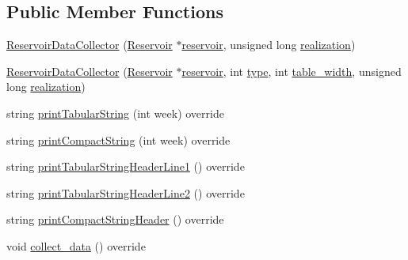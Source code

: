 \subsection*{Public Member Functions}
\begin{DoxyCompactItemize}
\item 
\mbox{\hyperlink{classReservoirDataCollector_a7647adce7b2d7a8598ae678a5015dde5_a7647adce7b2d7a8598ae678a5015dde5}{Reservoir\+Data\+Collector}} (\mbox{\hyperlink{classReservoir}{Reservoir}} $\ast$\mbox{\hyperlink{classReservoirDataCollector_a188c8509a43e7f28362407f7508fde27_a188c8509a43e7f28362407f7508fde27}{reservoir}}, unsigned long \mbox{\hyperlink{classDataCollector_a9ef2887466fe3123aa19ef956a219b96_a9ef2887466fe3123aa19ef956a219b96}{realization}})
\item 
\mbox{\hyperlink{classReservoirDataCollector_aaca132902fa717e71a0b0d5d5078c04c_aaca132902fa717e71a0b0d5d5078c04c}{Reservoir\+Data\+Collector}} (\mbox{\hyperlink{classReservoir}{Reservoir}} $\ast$\mbox{\hyperlink{classReservoirDataCollector_a188c8509a43e7f28362407f7508fde27_a188c8509a43e7f28362407f7508fde27}{reservoir}}, int \mbox{\hyperlink{classDataCollector_acad1c22d67a8eb3db056ba776a131900_acad1c22d67a8eb3db056ba776a131900}{type}}, int \mbox{\hyperlink{classDataCollector_af46c27a47de92d92dcdae6b26a905a44_af46c27a47de92d92dcdae6b26a905a44}{table\+\_\+width}}, unsigned long \mbox{\hyperlink{classDataCollector_a9ef2887466fe3123aa19ef956a219b96_a9ef2887466fe3123aa19ef956a219b96}{realization}})
\item 
string \mbox{\hyperlink{classReservoirDataCollector_a81777b029bf26be403b9f4d67f01588b_a81777b029bf26be403b9f4d67f01588b}{print\+Tabular\+String}} (int week) override
\item 
string \mbox{\hyperlink{classReservoirDataCollector_a0b68d7fa4a6d704350340d1ac3e8a1d2_a0b68d7fa4a6d704350340d1ac3e8a1d2}{print\+Compact\+String}} (int week) override
\item 
string \mbox{\hyperlink{classReservoirDataCollector_a62e7c7abc34c8154b338dfbd284ed665_a62e7c7abc34c8154b338dfbd284ed665}{print\+Tabular\+String\+Header\+Line1}} () override
\item 
string \mbox{\hyperlink{classReservoirDataCollector_ae2f8e808c5960608e510a64c7f00ad1b_ae2f8e808c5960608e510a64c7f00ad1b}{print\+Tabular\+String\+Header\+Line2}} () override
\item 
string \mbox{\hyperlink{classReservoirDataCollector_aa8346433f037bbca41f3c8450f7f88cf_aa8346433f037bbca41f3c8450f7f88cf}{print\+Compact\+String\+Header}} () override
\item 
void \mbox{\hyperlink{classReservoirDataCollector_a5c2e1355c40e45b409168e98245eef95_a5c2e1355c40e45b409168e98245eef95}{collect\+\_\+data}} () override
\end{DoxyCompactItemize}

